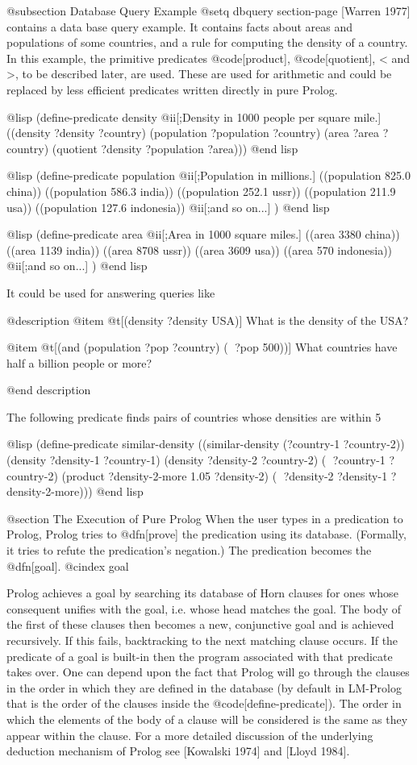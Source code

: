 {@subsection Database Query Example
@setq dbquery section-page
[Warren 1977] contains a data base query example.
It contains
facts about areas and populations of some countries, and a rule for computing
the density of a country.
In this example, the primitive predicates 
@code[product], @code[quotient], < and >,
to be described later, are used.
These are used for arithmetic and could be replaced by less efficient
predicates written directly in pure Prolog.

@lisp
(define-predicate density
  @ii[;Density in 1000 people per square mile.]
  ((density ?density ?country)
   (population ?population ?country)
   (area ?area ?country)
   (quotient ?density ?population ?area)))
@end lisp

@lisp
(define-predicate population
  @ii[;Population in millions.]
  ((population 825.0 china))
  ((population 586.3 india))
  ((population 252.1 ussr))
  ((population 211.9 usa))
  ((population 127.6 indonesia))
  @ii[;and so on...]
  )
@end lisp

@lisp
(define-predicate area
  @ii[;Area in 1000 square miles.]
  ((area 3380 china))
  ((area 1139 india))
  ((area 8708 ussr))
  ((area 3609 usa))
  ((area 570 indonesia))
  @ii[;and so on...]
  )
@end lisp

It could be used for answering queries like

@description
@item @t[(density ?density USA)]
What is the density of the USA?

@item @t[(and (population ?pop ?country) ( ?pop 500))]
What countries have half a billion people or more?

@end description

The following predicate finds pairs of countries whose densities are
within 5%

@lisp
(define-predicate similar-density
  ((similar-density (?country-1 ?country-2))
   (density ?density-1 ?country-1)
   (density ?density-2 ?country-2)
   ( ?country-1 ?country-2)
   (product ?density-2-more 1.05 ?density-2)
   ( ?density-2 ?density-1 ?density-2-more)))
@end lisp

@section The Execution of Pure Prolog
When the user types in a predication to Prolog, Prolog tries to @dfn[prove]
the predication using its database.  (Formally, it tries to refute the
predication's negation.)
The predication becomes the @dfn[goal].
@cindex goal

Prolog achieves a goal by searching its database of Horn clauses for ones
whose consequent unifies with the goal, i.e. whose head matches the goal.
The body of the first of these clauses then becomes a new, conjunctive
goal and is achieved recursively.
If this fails, backtracking to the next matching clause occurs.
If the predicate of a goal is built-in then the program associated with that
predicate takes over.
One can depend upon the fact that Prolog will go through the clauses in the
order in which they are defined in the database (by default in LM-Prolog
that is the order of the clauses inside the @code[define-predicate]).
The order in which the elements of the body of a clause will be considered is
the same as they appear within the clause.
For a more detailed discussion of the underlying deduction mechanism of Prolog
see [Kowalski 1974] and [Lloyd 1984].

}
